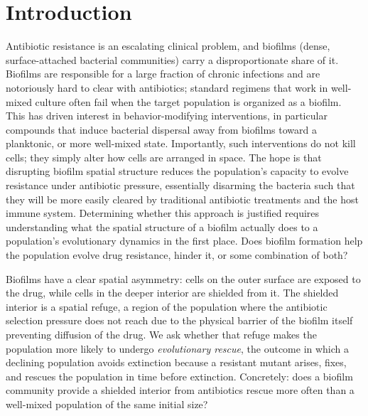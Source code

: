 \section{Introduction}
\label{sec:intro}

Antibiotic resistance is an escalating clinical problem, and biofilms (dense, surface-attached bacterial communities) carry a disproportionate share of it. Biofilms are responsible for a large fraction of chronic infections and are notoriously hard to clear with antibiotics; standard regimens that work in well-mixed culture often fail when the target population is organized as a biofilm. This has driven interest in behavior-modifying interventions, in particular compounds that induce bacterial dispersal away from biofilms toward a planktonic, or more well-mixed state. Importantly, such interventions do not kill cells; they simply alter how cells are arranged in space. The hope is that disrupting biofilm spatial structure reduces the population's capacity to evolve resistance under antibiotic pressure, essentially disarming the bacteria such that they will be more easily cleared by traditional antibiotic treatments and the host immune system. Determining whether this approach is justified requires understanding what the spatial structure of a biofilm actually does to a population's evolutionary dynamics in the first place. Does biofilm formation help the population evolve drug resistance, hinder it, or some combination of both?

Biofilms have a clear spatial asymmetry: cells on the outer surface are exposed to the drug, while cells in the deeper interior are shielded from it. The shielded interior is a spatial refuge, a region of the population where the antibiotic selection pressure does not reach due to the physical barrier of the biofilm itself preventing diffusion of the drug. We ask whether that refuge makes the population more likely to undergo \emph{evolutionary rescue}, the outcome in which a declining population avoids extinction because a resistant mutant arises, fixes, and rescues the population in time before extinction. Concretely: does a biofilm community provide a shielded interior from antibiotics rescue more often than a well-mixed population of the same initial size?

